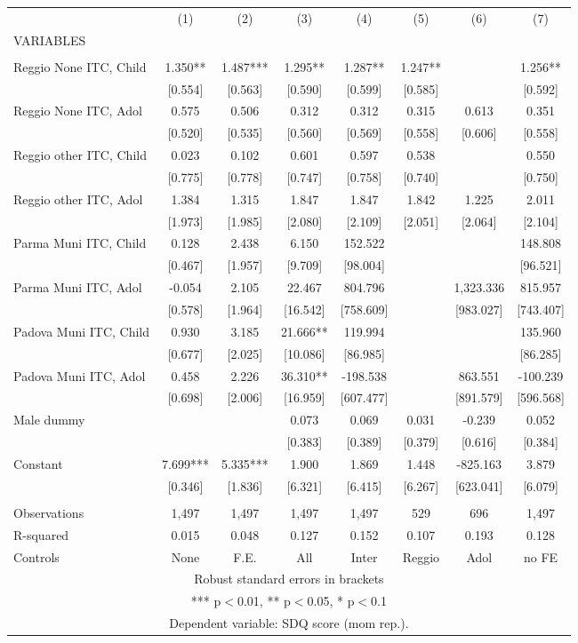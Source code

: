 \begin{tabular}{lccccccc} \hline
 & (1) & (2) & (3) & (4) & (5) & (6) & (7) \\
VARIABLES &  &  &  &  &  &  &  \\ \hline
 &  &  &  &  &  &  &  \\
Reggio None ITC, Child & 1.350** & 1.487*** & 1.295** & 1.287** & 1.247** &  & 1.256** \\
 & [0.554] & [0.563] & [0.590] & [0.599] & [0.585] &  & [0.592] \\
Reggio None ITC, Adol & 0.575 & 0.506 & 0.312 & 0.312 & 0.315 & 0.613 & 0.351 \\
 & [0.520] & [0.535] & [0.560] & [0.569] & [0.558] & [0.606] & [0.558] \\
Reggio other ITC, Child & 0.023 & 0.102 & 0.601 & 0.597 & 0.538 &  & 0.550 \\
 & [0.775] & [0.778] & [0.747] & [0.758] & [0.740] &  & [0.750] \\
Reggio other ITC, Adol & 1.384 & 1.315 & 1.847 & 1.847 & 1.842 & 1.225 & 2.011 \\
 & [1.973] & [1.985] & [2.080] & [2.109] & [2.051] & [2.064] & [2.104] \\
Parma Muni ITC, Child & 0.128 & 2.438 & 6.150 & 152.522 &  &  & 148.808 \\
 & [0.467] & [1.957] & [9.709] & [98.004] &  &  & [96.521] \\
Parma Muni ITC, Adol & -0.054 & 2.105 & 22.467 & 804.796 &  & 1,323.336 & 815.957 \\
 & [0.578] & [1.964] & [16.542] & [758.609] &  & [983.027] & [743.407] \\
Padova Muni ITC, Child & 0.930 & 3.185 & 21.666** & 119.994 &  &  & 135.960 \\
 & [0.677] & [2.025] & [10.086] & [86.985] &  &  & [86.285] \\
Padova Muni ITC, Adol & 0.458 & 2.226 & 36.310** & -198.538 &  & 863.551 & -100.239 \\
 & [0.698] & [2.006] & [16.959] & [607.477] &  & [891.579] & [596.568] \\
Male dummy &  &  & 0.073 & 0.069 & 0.031 & -0.239 & 0.052 \\
 &  &  & [0.383] & [0.389] & [0.379] & [0.616] & [0.384] \\
Constant & 7.699*** & 5.335*** & 1.900 & 1.869 & 1.448 & -825.163 & 3.879 \\
 & [0.346] & [1.836] & [6.321] & [6.415] & [6.267] & [623.041] & [6.079] \\
 &  &  &  &  &  &  &  \\
Observations & 1,497 & 1,497 & 1,497 & 1,497 & 529 & 696 & 1,497 \\
R-squared & 0.015 & 0.048 & 0.127 & 0.152 & 0.107 & 0.193 & 0.128 \\
 Controls & None & F.E. & All & Inter & Reggio & Adol & no FE \\ \hline
\multicolumn{8}{c}{ Robust standard errors in brackets} \\
\multicolumn{8}{c}{ *** p$<$0.01, ** p$<$0.05, * p$<$0.1} \\
\multicolumn{8}{c}{ Dependent variable: SDQ score (mom rep.).} \\
\end{tabular}
